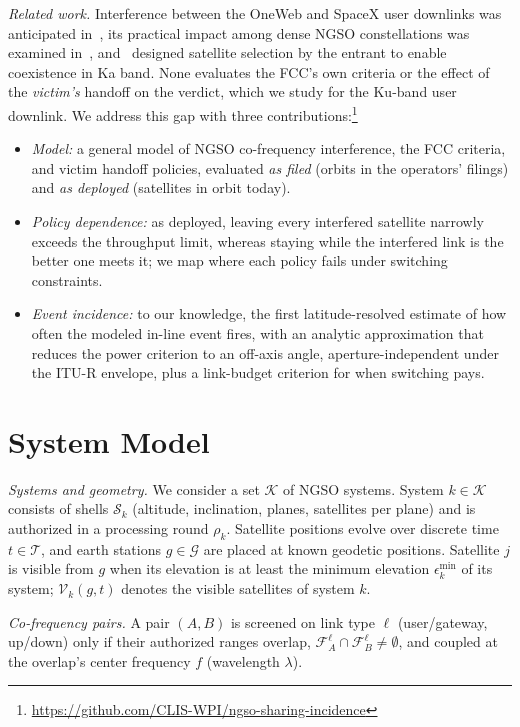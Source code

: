 \documentclass[conference]{IEEEtran}
\begin{document}
\emph{Related work.} Interference between the OneWeb and SpaceX user downlinks
was anticipated in~\cite[Sec.~5.1]{delportillo2019}, its practical impact among
dense NGSO constellations was examined in~\cite{braun2019},
and~\cite{kim2025,kim2026selection} designed satellite selection by the entrant to
enable coexistence in Ka band. None evaluates the FCC's own criteria or the
effect of the \emph{victim's} handoff on the verdict, which we study for the
Ku-band user downlink. We address this gap with three
contributions:\footnote{\url{https://github.com/CLIS-WPI/ngso-sharing-incidence}}
\begin{itemize}
\item \emph{Model:} a general model of NGSO co-frequency interference, the
FCC criteria, and victim handoff policies, evaluated \emph{as filed}
(orbits in the operators' filings) and \emph{as deployed} (satellites in orbit
today).
\item \emph{Policy dependence:} as deployed, leaving every interfered satellite
narrowly exceeds the throughput limit, whereas staying while the interfered link
is the better one meets it; we map where each policy fails under switching
constraints.
\item \emph{Event incidence:} to our knowledge, the first latitude-resolved
estimate of how often the modeled in-line event fires, with an analytic
approximation that reduces the power criterion to an off-axis angle,
aperture-independent under the ITU-R envelope, plus a link-budget criterion for when switching pays.
\end{itemize}

\section{System Model}
\label{sec:model}

\emph{Systems and geometry.} We consider a set $\mathcal{K}$ of NGSO systems.
System $k \in \mathcal{K}$ consists of shells $\mathcal{S}_k$ (altitude,
inclination, planes, satellites per plane) and is authorized in a processing
round $\rho_k$. Satellite positions evolve over discrete time
$t \in \mathcal{T}$, and earth stations $g \in \mathcal{G}$ are placed at known
geodetic positions. Satellite $j$ is visible from $g$ when its elevation is at
least the minimum elevation $\epsilon_k^{\min}$ of its system;
$\mathcal{V}_{k}(g,t)$ denotes the visible satellites of system $k$.

\emph{Co-frequency pairs.} A pair $(A,B)$ is screened on link type $\ell$
(user/gateway, up/down) only if their authorized ranges overlap,
$\mathcal{F}_A^{\ell} \cap \mathcal{F}_B^{\ell} \neq \emptyset$, and coupled at the
overlap's center frequency $f$ (wavelength $\lambda$).
\end{document}
